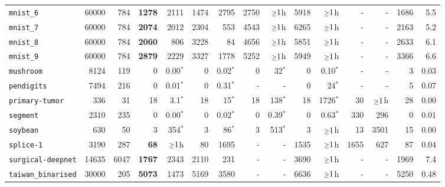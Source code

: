 \begin{tabular}{lccrrrrrrrrrrrr}
\texttt{mnist\_6} & \multicolumn{1}{r}{60000} & \multicolumn{1}{r}{784}  & \textbf{1278} & 2111 & 1474 & 2795 & 2750 & $\mathsmaller{\geq}1$h & 5918 & $\mathsmaller{\geq}1$h & - & - & 1686 & 5.5\\
\texttt{mnist\_7} & \multicolumn{1}{r}{60000} & \multicolumn{1}{r}{784}  & \textbf{2074} & 2012 & 2304 & 553 & 4543 & $\mathsmaller{\geq}1$h & 6265 & $\mathsmaller{\geq}1$h & - & - & 2163 & 5.2\\
\texttt{mnist\_8} & \multicolumn{1}{r}{60000} & \multicolumn{1}{r}{784}  & \textbf{2060} & 806 & 3228 & 84 & 4656 & $\mathsmaller{\geq}1$h & 5851 & $\mathsmaller{\geq}1$h & - & - & 2633 & 6.1\\
\texttt{mnist\_9} & \multicolumn{1}{r}{60000} & \multicolumn{1}{r}{784}  & \textbf{2879} & 2229 & 3327 & 1778 & 5252 & $\mathsmaller{\geq}1$h & 5949 & $\mathsmaller{\geq}1$h & - & - & 3366 & 6.6\\
\texttt{mushroom} & \multicolumn{1}{r}{8124} & \multicolumn{1}{r}{119}  & 0 & 0.00$^*$ & 0 & 0.02$^*$ & 0 & 32$^*$ & 0 & 0.10$^*$ & - & - & 3 & 0.03\\
\texttt{pendigits} & \multicolumn{1}{r}{7494} & \multicolumn{1}{r}{216}  & 0 & 0.01$^*$ & 0 & 0.31$^*$ & - & - & 0 & 24$^*$ & - & - & 5 & 0.07\\
\texttt{primary-tumor} & \multicolumn{1}{r}{336} & \multicolumn{1}{r}{31}  & 18 & 3.1$^*$ & 18 & 15$^*$ & 18 & 138$^*$ & 18 & 1726$^*$ & 30 & $\mathsmaller{\geq}1$h & 28 & 0.00\\
\texttt{segment} & \multicolumn{1}{r}{2310} & \multicolumn{1}{r}{235}  & 0 & 0.00$^*$ & 0 & 0.02$^*$ & 0 & 0.39$^*$ & 0 & 0.63$^*$ & 330 & 296 & 0 & 0.01\\
\texttt{soybean} & \multicolumn{1}{r}{630} & \multicolumn{1}{r}{50}  & 3 & 354$^*$ & 3 & 86$^*$ & 3 & 513$^*$ & 3 & $\mathsmaller{\geq}1$h & 13 & 3501 & 15 & 0.00\\
\texttt{splice-1} & \multicolumn{1}{r}{3190} & \multicolumn{1}{r}{287}  & \textbf{68} & $\mathsmaller{\geq}1$h & 80 & 1695 & - & - & 1535 & $\mathsmaller{\geq}1$h & 1655 & 627 & 87 & 0.04\\
\texttt{surgical-deepnet} & \multicolumn{1}{r}{14635} & \multicolumn{1}{r}{6047}  & \textbf{1767} & 2343 & 2110 & 231 & - & - & 3690 & $\mathsmaller{\geq}1$h & - & - & 1969 & 7.4\\
\texttt{taiwan\_binarised} & \multicolumn{1}{r}{30000} & \multicolumn{1}{r}{205}  & \textbf{5073} & 1473 & 5169 & 3580 & - & - & 6636 & $\mathsmaller{\geq}1$h & - & - & 5250 & 0.48\\

\end{tabular}
